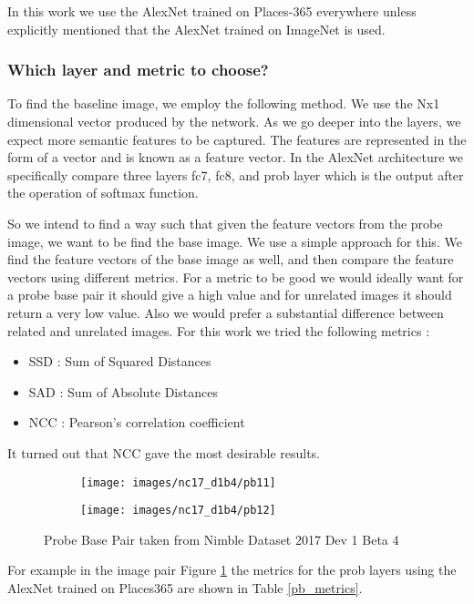 \documentclass{article}
\begin{document}
In this work we use the AlexNet trained on Places-365 everywhere unless explicitly mentioned that the AlexNet trained on ImageNet is used.

\subsubsection{Which layer and metric to choose?}
To find the baseline image, we employ the following method. We use the Nx1 dimensional vector produced by the network. As we go deeper into the layers, we expect more semantic features to be captured. The features are represented in the form of a vector and is known as a feature vector. In the AlexNet architecture we specifically compare three layers fc7, fc8, and prob layer which is the output after the operation of softmax function.

So we intend to find a way such that given the feature vectors from the probe image, we want to be find the base image. We use a simple approach for this. We find the feature vectors of the base image as well, and then compare the feature vectors using different metrics. For a metric to be good we would ideally want for a probe base pair it should give a high value and for unrelated images it should return a very low value. Also we would prefer a substantial difference between related and unrelated images. For this work we tried the following metrics :
\begin{itemize}
\item SSD : Sum of Squared Distances
\item SAD : Sum of Absolute Distances
\item NCC : Pearson's correlation coefficient
\end{itemize}

It turned out that NCC gave the most desirable results.
\begin{figure}[H]
  \centering
  \begin{subfigure}[t]{0.45\textwidth}
    \centering
    \texttt{[image: images/nc17\_d1b4/pb11]}
  \end{subfigure}
  \begin{subfigure}[t]{0.45\textwidth}
    \centering
    \texttt{[image: images/nc17\_d1b4/pb12]}
  \end{subfigure}
  \caption{Probe Base Pair taken from Nimble Dataset 2017 Dev 1 Beta 4}
  \label{fig:ncc_res}
\end{figure}

For example in the image pair Figure \ref{fig:ncc_res} the metrics for the prob layers using the AlexNet trained on Places365 are shown in Table \ref{pb_metrics}.
\end{document}
